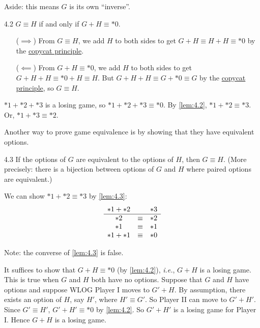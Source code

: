 \documentclass[12pt,letterpaper]{report}
\begin{document}
Aside: this means $G$ is its own ``inverse''.

\begin{lem}{}{4.2}
  $G \equiv H$ if and only if $G + H \equiv *0$.
\end{lem}

\begin{thmproof}
  \begin{itemize}[leftmargin=4em]
    \item[($\implies$)]
      From $G \equiv H$, we add $H$ to both sides to get $G + H \equiv H + H \equiv *0$ by the
      \hyperref[lem:4.1]{copycat principle}.
    \item[($\impliedby$)]
      From $G + H \equiv *0$, we add $H$ to both sides to get $G + H + H \equiv *0 + H \equiv H$.
      But $G + H + H \equiv G + *0 \equiv G$ by the \hyperref[thm:3.5]{copycat principle}, so
      $G \equiv H$.
  \end{itemize}
\end{thmproof}

\begin{ex}
  $*1 + *2 + *3$ is a losing game, so $*1 + *2 + *3 \equiv *0$.
  By \cref{lem:4.2}, $*1 + *2 \equiv *3$.
  Or, $*1 + *3 \equiv *2$.
\end{ex}

Another way to prove game equivalence is by showing that they have equivalent options.

\begin{lem}{}{4.3}
  If the options of $G$ are equivalent to the options of $H$, then $G \equiv H$.
  (More precisely: there is a bijection between options of $G$ and $H$ where paired options are
  equivalent.)
\end{lem}

\begin{ex}
  We can show $*1 + *2 \equiv *3$ by \cref{lem:4.3}:
  \[
    \begin{array}{c c c}
      *1 + *2 & & *3 \\
      \hline
      *2 & \equiv & *2 \\
      *1 & \equiv & *1 \\
      *1 + *1 & \equiv & *0 \\
    \end{array}
  \]
\end{ex}

Note: the converse of \cref{lem:4.3} is false.

\begin{thmproof}
  It suffices to show that $G + H \equiv *0$ (by \cref{lem:4.2}), \emph{i.e.}, $G + H$ is a losing
  game.
  This is true when $G$ and $H$ both have no options.
  Suppose that $G$ and $H$ have options and suppose WLOG Player I moves to $G' + H$.
  By assumption, there exists an option of $H$, say $H'$, where $H' \equiv G'$.
  So Player II can move to $G' + H'$.
  Since $G' \equiv H'$, $G' + H' \equiv *0$ by \cref{lem:4.2}.
  So $G' + H'$ is a losing game for Player I.
  Hence $G + H$ is a losing game.
\end{thmproof}
\end{document}
